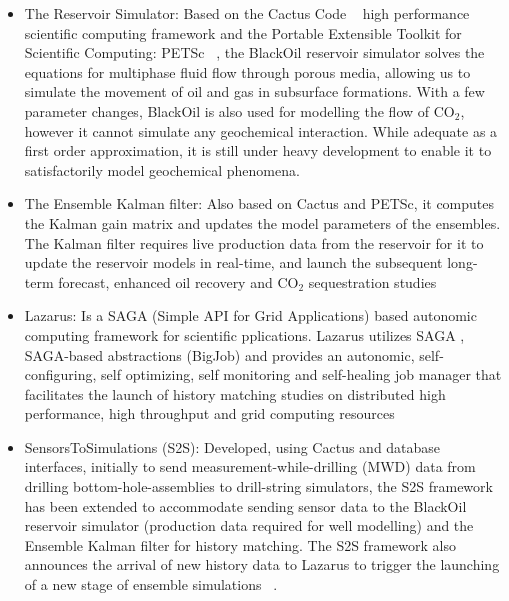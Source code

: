 \documentclass{rspublic}
\begin{document}
\begin{itemize}

\item The Reservoir Simulator: Based on the Cactus Code
  ~\citep{cactus_web} high performance scientific computing framework
  and the Portable Extensible Toolkit for Scientific Computing: PETSc
  ~\citep{PETSc}, the BlackOil reservoir simulator solves the
  equations for multiphase fluid flow through porous media, allowing
  us to simulate the movement of oil and gas in subsurface
  formations. With a few parameter changes, BlackOil is also used for
  modelling the flow of CO$_2$, however it cannot simulate any
  geochemical interaction. While adequate as a first order
  approximation, it is still under heavy development to enable it to
  satisfactorily model geochemical phenomena.

\item The Ensemble Kalman filter: Also based on Cactus and PETSc, it
  computes the Kalman gain matrix and updates the model parameters of
  the ensembles. The Kalman filter requires live production data from
  the reservoir for it to update the reservoir models in real-time,
  and launch the subsequent long-term forecast, enhanced oil recovery
  and CO$_2$ sequestration studies

\item Lazarus: Is a SAGA (Simple API for Grid Applications) based
  autonomic computing framework for scientific pplications. Lazarus
  utilizes SAGA , SAGA-based abstractions (BigJob) and provides an
  autonomic, self-configuring, self optimizing, self monitoring and
  self-healing job manager that facilitates the launch of history
  matching studies on distributed high performance, high throughput
  and grid computing resources ~\citep{gmac}

\item SensorsToSimulations (S2S): Developed, using Cactus and database
  interfaces, initially to send measurement-while-drilling (MWD) data
  from drilling bottom-hole-assemblies to drill-string simulators, the
  S2S framework has been extended to accommodate sending sensor data
  to the BlackOil reservoir simulator (production data required for
  well modelling) and the Ensemble Kalman filter for history
  matching. The S2S framework also announces the arrival of new
  history data to Lazarus to trigger the launching of a new stage of
  ensemble simulations ~\citep{Duff1,Duff2}.

\end{itemize}
\end{document}
